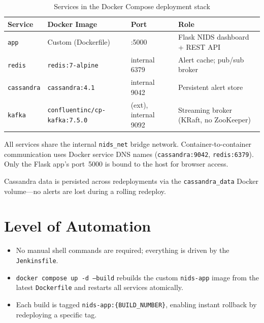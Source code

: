 \documentclass[12pt,a4paper]{report}
\begin{document}
\begin{table}[H]
  \centering
  \small
  \caption{Services in the Docker Compose deployment stack}
  \label{tab:services}
  \begin{tabularx}{\textwidth}{>{\raggedright\arraybackslash}p{1.7cm} >{\raggedright\arraybackslash}p{4.2cm} >{\raggedright\arraybackslash}p{2.7cm} >{\raggedright\arraybackslash}X}
    \toprule
    \textbf{Service}   & \textbf{Docker Image}               & \textbf{Port}  & \textbf{Role} \\
    \midrule
    \texttt{app}       & Custom (Dockerfile)                 & 5000:5000      & Flask NIDS dashboard + REST API \\
    \texttt{redis}     & \texttt{redis:7-alpine}             & internal 6379  & Alert cache; pub/sub broker \\
    \texttt{cassandra} & \texttt{cassandra:4.1}              & internal 9042  & Persistent alert store \\
    \texttt{kafka}     & \nolinkurl{confluentinc/cp-kafka:7.5.0} & 19092 (ext),
      internal 9092 & Streaming broker (KRaft, no ZooKeeper) \\
    \bottomrule
  \end{tabularx}
\end{table}

All services share the internal \texttt{nids\_net} bridge network.
Container-to-container communication uses Docker service DNS names
(\texttt{cassandra:9042}, \texttt{redis:6379}).  Only the Flask app's
port~5000 is bound to the host for browser access.

Cassandra data is persisted across redeployments via the
\texttt{cassandra\_data} Docker volume---no alerts are lost during a rolling
redeploy.

\section{Level of Automation}
\begin{itemize}
  \item No manual shell commands are required; everything is driven by the
        \texttt{Jenkinsfile}.
  \item \texttt{docker compose up -d --build} rebuilds the custom
        \texttt{nids-app} image from the latest \texttt{Dockerfile} and
        restarts all services atomically.
  \item Each build is tagged \texttt{nids-app:\{BUILD\_NUMBER\}}, enabling
        instant rollback by redeploying a specific tag.
\end{itemize}
\end{document}
